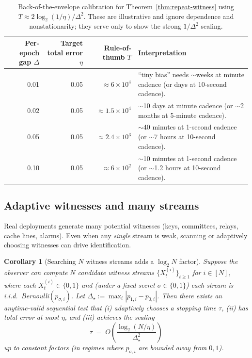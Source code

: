 \documentclass[11pt]{article}
\newtheorem{corollary}{Corollary}
\begin{document}
\begin{table}[h]
\centering
\footnotesize
\setlength{\tabcolsep}{4pt}
\begin{tabularx}{\linewidth}{@{}r r r >{\raggedright\arraybackslash}X@{}}
\toprule
Per-epoch gap $\Delta$ & Target total error $\eta$ & Rule-of-thumb $T$ & Interpretation \\
\midrule
0.01 & 0.05 & $\approx 6\times 10^4$ & ``tiny bias'' needs $\sim$weeks at minute cadence (or days at 10-second cadence). \\
0.02 & 0.05 & $\approx 1.5\times 10^4$ & $\sim$10 days at minute cadence (or $\sim$2 months at 5-minute cadence). \\
0.05 & 0.05 & $\approx 2.4\times 10^3$ & $\sim$40 minutes at 1-second cadence (or $\sim$7 hours at 10-second cadence). \\
0.10 & 0.05 & $\approx 6\times 10^2$ & $\sim$10 minutes at 1-second cadence (or $\sim$1.2 hours at 10-second cadence). \\
\bottomrule
\end{tabularx}
\normalsize
\caption{Back-of-the-envelope calibration for Theorem~\ref{thm:repeat-witness} using $T\approx 2\log_2(1/\eta)/\Delta^2$.
These are illustrative and ignore dependence and nonstationarity; they serve only to show the strong $1/\Delta^2$ scaling.
}
\label{tab:calibration}
\end{table}


\subsection{Adaptive witnesses and many streams}
Real deployments generate many potential witnesses (keys, committees, relays, cache lines, alarms).
Even when any \emph{single} stream is weak, scanning or adaptively choosing witnesses can drive identification.

\begin{corollary}[Searching $N$ witness streams adds a $\log_2 N$ factor]
\label{cor:many-witness-search}
Suppose the observer can compute $N$ candidate witness streams
$\{X^{(i)}_t\}_{t\ge 1}$ for $i\in[N]$, where each $X^{(i)}_t\in\{0,1\}$ and (under a fixed secret $\sigma\in\{0,1\}$) each stream is i.i.d.\ Bernoulli$(p_{\sigma,i})$.
Let $\Delta_\star := \max_i |p_{1,i}-p_{0,i}|$.
Then there exists an anytime-valid sequential test that (i) adaptively chooses a stopping time $\tau$,
(ii) has total error at most $\eta$, and (iii) achieves the scaling
\[
\tau \;=\; O\!\left(\frac{\log_2(N/\eta)}{\Delta_\star^2}\right)
\]
up to constant factors (in regimes where $p_{\sigma,i}$ are bounded away from $0,1$).
\end{corollary}
\end{document}
